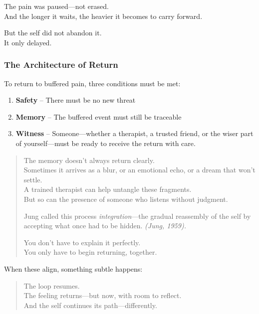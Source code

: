The pain was paused---not erased.\\
And the longer it waits, the heavier it becomes to carry forward.

But the self did not abandon it.\\
It only delayed.

\subsubsection{\texorpdfstring{\textbf{The Architecture of
Return}}{The Architecture of Return}}\label{the-architecture-of-return}

To return to buffered pain, three conditions must be met:

\begin{enumerate}
\def\labelenumi{\arabic{enumi}.}
\item
  \textbf{Safety} -- There must be no new threat
\item
  \textbf{Memory} -- The buffered event must still be traceable
\item
  \textbf{Witness} -- Someone---whether a therapist, a trusted friend,
  or the wiser part of yourself---must be ready to receive the return
  with care.
\end{enumerate}

\begin{quote}
The memory doesn't always return clearly.\\
Sometimes it arrives as a blur, or an emotional echo, or a dream that
won't settle.\\
A trained therapist can help untangle these fragments.\\
But so can the presence of someone who listens without judgment.

Jung called this process \emph{integration}---the gradual reassembly of
the self by accepting what once had to be hidden. \emph{(Jung, 1959).}

You don't have to explain it perfectly.\\
You only have to begin returning, together.
\end{quote}

When these align, something subtle happens:

\begin{quote}
The loop resumes.\\
The feeling returns---but now, with room to reflect.\\
And the self continues its path---differently.
\end{quote}


